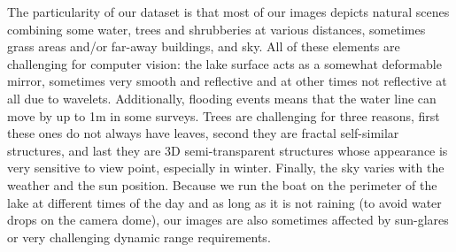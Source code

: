 The particularity of our dataset is that most of our images depicts natural
scenes combining some water, trees and shrubberies at various distances,
sometimes grass areas and/or far-away buildings, and sky. All of these elements
are challenging for computer vision: the lake surface acts as a somewhat
deformable mirror, sometimes very smooth and reflective and at other times not
reflective at all due to wavelets. Additionally, flooding events means that the
water line can move by up to 1m in some surveys. Trees are challenging for
three reasons, first these ones do not always have leaves, second they are
fractal self-similar structures, and last they are 3D semi-transparent
structures whose appearance is very sensitive to view point, especially in
winter. Finally, the sky varies with the weather and the sun position. Because
we run the boat on the perimeter of the lake at different times of the day and
as long as it is not raining (to avoid water drops on the camera dome), our
images are also sometimes affected by sun-glares or very challenging dynamic
range requirements. 



